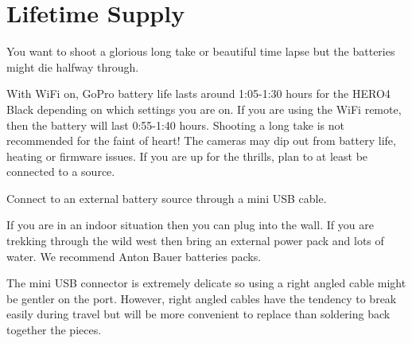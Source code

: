 \chapter{Lifetime Supply}
\pagecolor{white}
\label{chap:8}
\begin{fullwidth}


\problem

{\large You want to shoot a glorious long take or beautiful time lapse but the batteries might die halfway through. \par}

With WiFi on, GoPro battery life lasts around 1:05-1:30 hours for the HERO4 Black depending on which settings you are on. If you are using the WiFi remote, then the battery will last 0:55-1:40 hours. Shooting a long take is not recommended for the faint of heart! The cameras may dip out from battery life, heating or firmware issues. If you are up for the thrills, plan to at least be connected to a source. 


\solution

{\large Connect to an external battery source through a mini USB cable. \par}

If you are in an indoor situation then you can plug into the wall. If you are trekking through the wild west then bring an external power pack and lots of water. We recommend Anton Bauer batteries packs.


\tip The mini USB connector is extremely delicate so using a right angled cable might be gentler on the port. However, right angled cables have the tendency to break easily during travel but will be more convenient to replace than soldering back together the pieces. 





\clearpage
\end{fullwidth}

